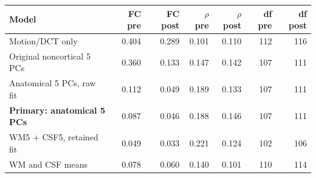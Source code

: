 \begin{tabular}{lrrrrrr}
\toprule
Model & FC pre & FC post & $\rho$ pre & $\rho$ post & df pre & df post \\
\midrule
Motion/DCT only & 0.404 & 0.289 & 0.101 & 0.110 & 112 & 116 \\
Original noncortical 5 PCs & 0.360 & 0.133 & 0.147 & 0.142 & 107 & 111 \\
Anatomical 5 PCs, raw fit & 0.112 & 0.049 & 0.189 & 0.133 & 107 & 111 \\
\textbf{Primary: anatomical 5 PCs} & 0.087 & 0.046 & 0.188 & 0.146 & 107 & 111 \\
WM5 + CSF5, retained fit & 0.049 & 0.033 & 0.221 & 0.124 & 102 & 106 \\
WM and CSF means & 0.078 & 0.060 & 0.140 & 0.101 & 110 & 114 \\
\bottomrule
\end{tabular}
